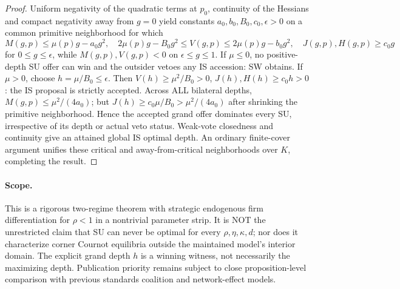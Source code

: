 \begin{proof}
Uniform negativity of the quadratic terms at $p_0$,
continuity of the Hessians and compact negativity away
from $g=0$ yield constants $a_0,b_0,B_0,c_0,\epsilon>0$
on a common primitive neighborhood for which
\[
 M(g,p)\le\mu(p)g-a_0g^2,\quad
 2\mu(p)g-B_0g^2\le V(g,p)
 \le2\mu(p)g-b_0g^2,\quad
 J(g,p),H(g,p)\ge c_0g
\]
for $0\le g\le\epsilon$, while
$M(g,p),V(g,p)<0$ on $\epsilon\le g\le1$.
If $\mu\le0$, no positive-depth SU offer can win and
the outsider vetoes any IS accession: SW obtains.
If $\mu>0$, choose $h=\mu/B_0\le\epsilon$.
Then $V(h)\ge\mu^2/B_0>0$, $J(h),H(h)\ge c_0h>0$:
the IS proposal is strictly accepted. Across ALL bilateral
depths, $M(g,p)\le\mu^2/(4a_0)$; but
$J(h)\ge c_0\mu/B_0>\mu^2/(4a_0)$
after shrinking the primitive neighborhood.
Hence the accepted grand offer dominates every SU,
irrespective of its depth or actual veto status.
Weak-vote closedness and continuity give an attained
global IS optimal depth. An ordinary finite-cover argument
unifies these critical and away-from-critical neighborhoods
over $K$, completing the result.
\end{proof}

\paragraph{Scope.}
This is a rigorous two-regime theorem with strategic
endogenous firm differentiation for $\rho<1$ in a
nontrivial parameter strip. It is NOT the unrestricted
claim that SU can never be optimal for every
$\rho,\eta,\kappa,d$; nor does it characterize corner
Cournot equilibria outside the maintained model's
interior domain. The explicit grand depth $h$ is a
winning witness, not necessarily the maximizing depth.
Publication priority remains subject to close
proposition-level comparison with previous standards
coalition and network-effect models.
